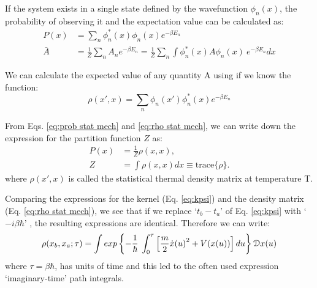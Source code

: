             If the system exists in a single state defined by the wavefunction $\phi_n(x)$, the probability of observing it and the expectation value can be calculated as:
            \begin{equation}
                \label{eq:prob stat mech}
                \begin{aligned}
                    P(x) &= \displaystyle\sum\limits_n \phi_n^*(x) \phi_n(x) e^{-\beta E_n}\\
                    \bar{A} &= \displaystyle \frac{1}{Z} \displaystyle\sum\limits_n A_n e^{-\beta E_n} = \frac{1}{Z} \displaystyle\sum\limits_n \int \phi_n^*(x) A \phi_n(x)\: e^{-\beta E_n} dx
                \end{aligned}
            \end{equation}

            We can calculate the expected value of any quantity A using if we know the function:
            \begin{equation}
                \label{eq:rho stat mech}
                \rho(x',x) = \displaystyle \sum\limits_n \phi_n(x') \phi_n^*(x) e^{-\beta E_n}
            \end{equation}

            From Eqs. \eqref{eq:prob stat mech} and \eqref{eq:rho stat mech}, we can write down the expression for the partition function $Z$ as:
            \begin{equation}
                \begin{aligned}
                    P(x) &= \frac{1}{Z} \rho(x,x),\\
                    Z &= \int \rho(x,x) dx \equiv \text{trace} \{\rho\}.
                \end{aligned}
            \end{equation}
            where $\rho(x',x)$ is called the statistical thermal density matrix at temperature T.

            Comparing the expressions for the kernel (Eq. \eqref{eq:kpsi}) and the density matrix (Eq. \eqref{eq:rho stat mech}), we see that if we replace `$t_b - t_a$' of Eq. \eqref{eq:kpsi} with `$-i \beta \hbar$' , the resulting expressions are identical. Therefore we can write:
            \begin{equation}
                \rho (x_b, x_a; \tau) = \displaystyle \int exp \left\{ - \frac{1}{\hbar} \: \int_0^{\tau} \left[ \frac{m}{2} {\dot{x}(u)}^2 + V(x(u)) \right] du \right\} \mathcal{D}x(u)
            \end{equation}
            where $\tau = \beta \hbar$, has units of time and this led to the often used expression `imaginary-time' path integrals.

